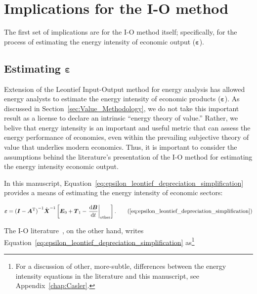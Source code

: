 \section{Implications for the I-O method}
\label{sec:Implications_for_IO}

The first set of implications are for the I-O method itself;
specifically, for the process of estimating
the energy intensity of economic output ($\bm{\varepsilon}$).


\subsection{Estimating $\bm{\varepsilon}$}
\label{sec:estimating_epsilon-implications_chapter}

Extension of the Leontief 
Input-Output method
for energy analysis has allowed energy analysts to estimate 
the energy intensity
of economic products ($\bm{\varepsilon}$). 
As discussed in Section~\ref{sec:Value_Methodology},
we do not take this important result as a license
to declare an intrinsic ``energy theory of value.''
Rather, we belive that energy intensity is an 
important and useful metric that can assess 
the energy performance of economies,
even within the prevailing subjective theory of value
that underlies modern economics. 
Thus, it is important to consider the assumptions behind
the literature's presentation of the I-O method 
for estimating the energy intensity economic output.

In this manuscript, Equation~\ref{eq:epsilon_leontief_depreciation_simplification} 
provides a means of estimating the energy intensity of economic sectors:

\begin{equation}
	\bm{\varepsilon} 
	= {(\vec{I} - \vec{A}^{\mathrm{T}})}^{-1}\hat{\vec{X}}^{-1}
		\left[\vec{E}_{0} 
				+ \vec{T}_{1} 
				- \left. \frac{\mathrm{d}\vec{B}}{\mathrm{d}t} \right|_{\mathrm{other}}
		\right]. \tag{\ref{eq:epsilon_leontief_depreciation_simplification}}
\end{equation}

\noindent{}The I-O literature~\cite{Bullard1975,Casler1984}, 
on the other hand, 
writes Equation~\ref{eq:epsilon_leontief_depreciation_simplification} 
as\footnote{For a discussion of other, more-subtle, differences
between the energy intensity equations in the literature
and this manuscript, see Appendix~\ref{chap:Casler}.}

